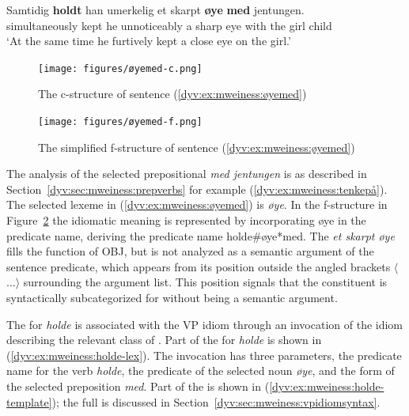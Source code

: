 \documentclass[output=paper]{langsci/langscibook}
\begin{document}
\ea\label{dyv:ex:mweiness:øyemed}
\gll Samtidig \textbf{holdt} han umerkelig et skarpt \textbf{øye} \textbf{med} jentungen. \\
     simultaneously kept he unnoticeably a sharp eye with {the girl child}\\
\glt `At the same time he furtively kept a close eye on the girl.'
\z


\begin{figure}
  \texttt{[image: figures/øyemed-c.png]}
  \caption{The c-structure of sentence (\ref{dyv:ex:mweiness:øyemed}) }
  \label{dyv:fig:mweiness:øyemed-c}
\end{figure}

\begin{figure}
  \texttt{[image: figures/øyemed-f.png]}
  \caption{The simplified f-structure of sentence (\ref{dyv:ex:mweiness:øyemed}) }
  \label{dyv:fig:mweiness:øyemed-f}
\end{figure}

The analysis of the selected prepositional  \textit{med jentungen} is as described in Section~\ref{dyv:sec:mweiness:prepverbs} for example (\ref{dyv:ex:mweiness:tenkepå}).
The selected lexeme in (\ref{dyv:ex:mweiness:øyemed}) is \textit{øye}.
In the f-structure in Figure~\ref{dyv:fig:mweiness:øyemed-f} the idiomatic meaning is represented by incorporating \textsf{øye} in the predicate name, deriving the predicate name \textsf{holde\#øye*med}. %
The  \textit{et skarpt øye} fills the function of \textsf{OBJ}, but is not analyzed as a semantic argument of the sentence predicate, which appears from its position outside the angled brackets $\langle$...$\rangle$ surrounding the argument list.
This position signals that the constituent is syntactically subcategorized for without being a semantic argument.

The  for \textit{holde} is associated with the VP idiom through an invocation of the idiom  describing the relevant class of .
Part of the  for \textit{holde} is shown in  (\ref{dyv:ex:mweiness:holde-lex}).
The  invocation has three parameters, the predicate name for the verb \textit{holde}, the predicate of the selected noun \textit{øye},  and the form of the selected preposition \textit{med}.
Part of the  is shown in  (\ref{dyv:ex:mweiness:holde-template}); the full  is discussed in Section~\ref{dyv:sec:mweiness:vpidiomsyntax}.
\end{document}
